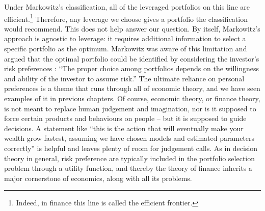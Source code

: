 Under Markowitz's classification, all of the leveraged portfolios on this line are efficient.\footnote{Indeed, in finance this line is called the efficient frontier.} Therefore, any leverage we choose gives a portfolio the classification would recommend. This does not help answer our question. By itself, Markowitz's approach is agnostic to leverage: it requires additional information to select a specific portfolio as the optimum. Markowitz was aware of this limitation and argued that the optimal portfolio could be identified by considering the investor's risk preferences \cite{Markowitz1991}: ``The proper choice among portfolios depends on the willingness and ability of the investor to assume risk.'' The ultimate reliance on personal preferences is a theme that runs through all of economic theory, and we have seen examples of it in previous chapters. Of course, economic theory, or finance theory, is not meant to replace human judgement and imagination, nor is it supposed to force certain products and behaviours on people -- but it is supposed to guide decisions. A statement like ``this is the action that will eventually make your wealth grow fastest, assuming we have chosen models and estimated parameters correctly'' is helpful and leaves plenty of room for judgement calls. As in decision theory in general, risk preference are typically included in the portfolio selection problem through a utility function, and thereby the theory of finance inherits a major cornerstone of economics, along with all its problems.


